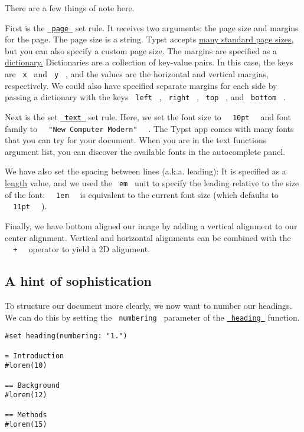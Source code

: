 There are a few things of note here.

First is the \href{/docs/reference/layout/page/}{\texttt{\ page\ }} set
rule. It receives two arguments: the page size and margins for the page.
The page size is a string. Typst accepts
\href{/docs/reference/layout/page/\#parameters-paper}{many standard page
sizes,} but you can also specify a custom page size. The margins are
specified as a
\href{/docs/reference/foundations/dictionary/}{dictionary.} Dictionaries
are a collection of key-value pairs. In this case, the keys are
\texttt{\ x\ } and \texttt{\ y\ } , and the values are the horizontal
and vertical margins, respectively. We could also have specified
separate margins for each side by passing a dictionary with the keys
\texttt{\ left\ } , \texttt{\ right\ } , \texttt{\ top\ } , and
\texttt{\ bottom\ } .

Next is the set \href{/docs/reference/text/text/}{\texttt{\ text\ }} set
rule. Here, we set the font size to
\texttt{\ }{\texttt{\ 10pt\ }}\texttt{\ } and font family to
\texttt{\ }{\texttt{\ "New\ Computer\ Modern"\ }}\texttt{\ } . The Typst
app comes with many fonts that you can try for your document. When you
are in the text function\textquotesingle s argument list, you can
discover the available fonts in the autocomplete panel.

We have also set the spacing between lines (a.k.a. leading): It is
specified as a \href{/docs/reference/layout/length/}{length} value, and
we used the \texttt{\ em\ } unit to specify the leading relative to the
size of the font: \texttt{\ }{\texttt{\ 1em\ }}\texttt{\ } is equivalent
to the current font size (which defaults to
\texttt{\ }{\texttt{\ 11pt\ }}\texttt{\ } ).

Finally, we have bottom aligned our image by adding a vertical alignment
to our center alignment. Vertical and horizontal alignments can be
combined with the \texttt{\ }{\texttt{\ +\ }}\texttt{\ } operator to
yield a 2D alignment.

\subsection{A hint of sophistication}\label{sophistication}

To structure our document more clearly, we now want to number our
headings. We can do this by setting the \texttt{\ numbering\ } parameter
of the \href{/docs/reference/model/heading/}{\texttt{\ heading\ }}
function.

\begin{verbatim}
#set heading(numbering: "1.")

= Introduction
#lorem(10)

== Background
#lorem(12)

== Methods
#lorem(15)
\end{verbatim}

